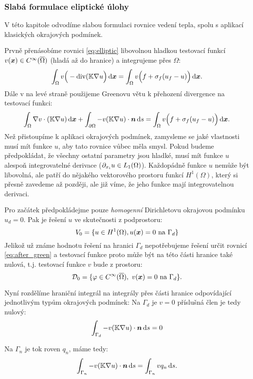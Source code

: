 \subsubsection{Slabá formulace eliptické úlohy}
\label{sec:weak_form_elliptic_eq}

V této kapitole odvodíme slabou formulaci rovnice vedení tepla, 
spolu s aplikací klasických okrajových podmínek.

Prvně přenásobíme rovnici \eqref{eq:elliptic} libovolnou hladkou testovací funkcí 
$v(\mathbf{\boldsymbol{x}}) \in C^\infty(\overline{\Omega})$ (hladá až do hranice) a integrujeme přes $\Omega$:
\[
    \int_\Omega v\Big(-\operatorname{div}({\mathbb{K}}\nabla u\Big) \,{\rm d} \mathbf{\boldsymbol{x}} = \int_\Omega v \Big(f + \sigma_f(u_f - u)\Big) \,{\rm d} \mathbf{\boldsymbol{x}}.
\]
Dále v na levé straně použijeme Greenovu větu k přehození divergence na testovací funkci:
\begin{equation}
    \label{eq:after_green}
    \int_\Omega \nabla v \cdot ({\mathbb{K}}\nabla u) \,{\rm d} \mathbf{\boldsymbol{x}} + \int_{\partial \Omega} -v({\mathbb{K}}\nabla u)\cdot \mathbf{\boldsymbol{n}} \,{\rm d} s 
    = \int_\Omega v \Big(f + \sigma_f(u_f - u)\Big) \,{\rm d} \mathbf{\boldsymbol{x}}.
\end{equation}
Než přistoupíme k aplikaci okrajových podmínek, zamysleme se jaké vlastnosti musí mít funkce $u$, 
aby tato rovnice vůbec měla smysl. Pokud budeme předpokládat, že 
všechny ostatní parametry jsou hladké, musí mít funkce $u$ alespoň integrovatelné derivace 
($\partial_{x_i} u \in L_1(\Omega)$). Každopádně funkce $u$ nemůže být libovolná, 
ale patří do nějakého vektorového prostoru funkcí $H^1(\Omega)$, který si přesně zavedeme až později,
ale již víme, že jeho funkce mají integrovatelnou derivaci.

Pro začátek předpokládejme pouze \emph{homogenní} Dirichletovu okrajovou podmínku $u_d =0$. 
Pak je řešení $u$ ve skutečnosti z podprostoru:
\[
    V_0 = \{ u\in H^1(\Omega), u(\mathbf{\boldsymbol{x}}) = 0\text{ na } \Gamma_d \}
\]
Jelikož už známe hodnotu řešení na hranici $\Gamma_d$ nepotřebujeme řešení určit rovnicí 
\eqref{eq:after_green} a testovací funkce proto může být na této části hranice také nulová, t.j. 
testovací funkce $v$ bude z prostoru:
\[
     \mathcal D_0 = \{\varphi \in C^\infty(\overline{\Omega}),\ v(\mathbf{\boldsymbol{x}}) = 0\text{ na } \Gamma_d\}.
\]

Nyní rozdělíme hraniční integrál na integrály přes části hranice odpovídající 
jednotlivým typům okrajových podmínek:
Na $\Gamma_d$ je $v=0$ příslušná člen je tedy nulový:
\[
    \int_{\Gamma_d} -v({\mathbb{K}}\nabla u)\cdot \mathbf{\boldsymbol{n}} \,{\rm d} s = 0
\]

Na $\Gamma_n$ je tok roven $q_n$, máme tedy:
\[
    \int_{\Gamma_n} -v({\mathbb{K}}\nabla u)\cdot \mathbf{\boldsymbol{n}} \,{\rm d} s = \int_{\Gamma_n} v q_n \,{\rm d} s.
\]


